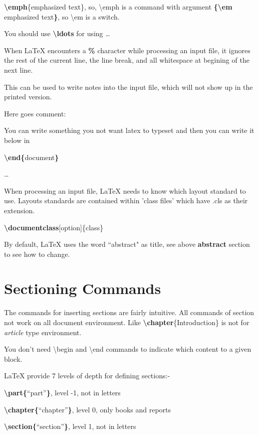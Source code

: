 \documentclass[12pt,a4paper,oneside]{article}
\begin{document}
\textbf{\textbackslash{}emph}\{emphasized text\}, so, \textbackslash{}emph is a command with argument
\textbf{\{\textbackslash{}em} emphasized text\textbf{\}}, so \textbackslash{}em is a switch.

You should use \textbf{\textbackslash{}ldots} for using \ldots

When {\LaTeX} encounters a \textbf{\%} character while processing an input file, it ignores the rest of the current line, the line break, and all whitespace at begining of the next line.

This can be used to write notes into the input file, which will not show up in the printed version.

Here goes comment: %

You can write something you not want latex to typeset and then you can write it below in

\textbf{\textbackslash{}end\{}document\textbf{\}}

\ldots

When processing an input file, {\LaTeX} needs to know which layout standard to use. Layouts standards are contained within 'class files' which have .cls as their extension.

\textbf{\textbackslash{}documentclass}[option]\{class\}

By default, {\LaTeX} uses the word ``abstract" as title, see above \textbf{abstract} section to see how to change.

\section{Sectioning Commands}

\noindent The commands for inserting sections are fairly intuitive. All commands of section not work on all document environment. Like \textbf{\textbackslash{}chapter}\{Introduction\} is not for \emph{article} type environment.

You don't need \textbackslash{}begin and \textbackslash{}end commands to indicate which content to a given block.

{\LaTeX} provide 7 levels of depth for defining sections:-

\textbf{\textbackslash{}part\{}``part''\textbf{\}}, level -1, not in letters

\textbf{\textbackslash{}chapter\{}``chapter''\textbf{\}}, level 0, only books and reports

\textbf{\textbackslash{}section\{}``section''\textbf{\}}, level 1, not in letters
\end{document}
